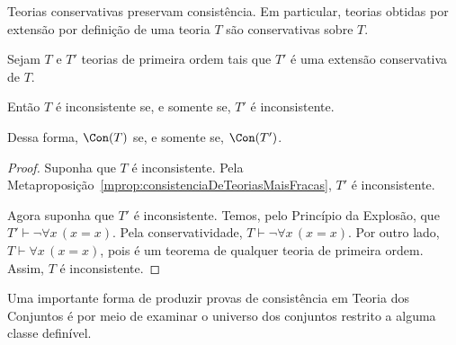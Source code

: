 Teorias conservativas preservam consistência.
Em particular, teorias obtidas por extensão por definição de uma teoria $T$ são conservativas sobre $T$.

\begin{metaproposition}
    Sejam $T$ e $T'$ teorias de primeira ordem tais que $T'$ é uma extensão conservativa de $T$.

    Então $T$ é inconsistente se, e somente se, $T'$ é inconsistente.

    Dessa forma, $\Con(T)$ se, e somente se, $\Con(T')$.
\end{metaproposition}
\begin{proof}
    Suponha que $T$ é inconsistente.
    Pela Metaproposição~\ref{mprop:consistenciaDeTeoriasMaisFracas}, $T'$ é inconsistente.

    Agora suponha que $T'$ é inconsistente.
    Temos, pelo Princípio da Explosão, que $T'\vdash \neg \forall x\, (x=x)$.
    Pela conservatividade, $T\vdash \neg \forall x\, (x=x)$.
    Por outro lado, $T\vdash \forall x\, (x=x)$, pois é um teorema de qualquer teoria de primeira ordem.
    Assim, $T$ é inconsistente.
\end{proof}

Uma importante forma de produzir provas de consistência em Teoria dos Conjuntos é por meio de examinar o universo dos conjuntos restrito a alguma classe definível.

